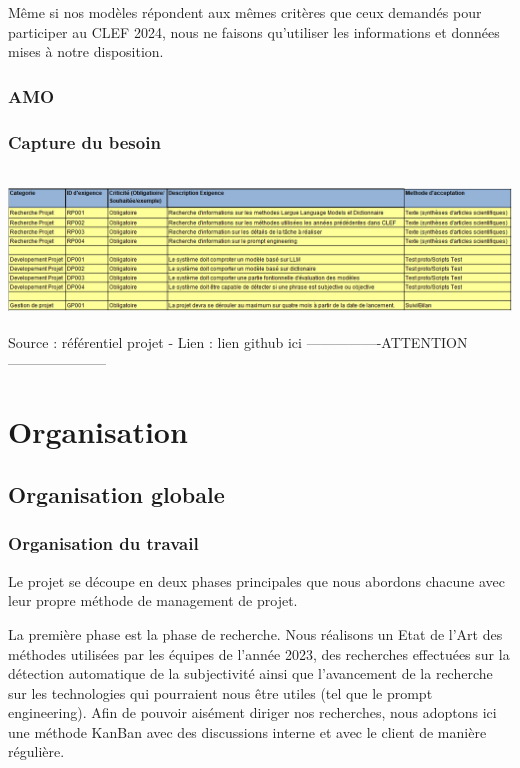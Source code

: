 \documentclass[11pt]{rapport_class}
\begin{document}
Même si nos modèles répondent aux mêmes critères que ceux demandés pour participer au CLEF 2024, nous ne faisons qu'utiliser les informations et données mises à notre disposition.


\subsection{AMO}

\subsection{Capture du besoin}
\begin{center}
\includegraphics[height=4.2cm]{capture_besoin.png}\\
\tiny
 Source : référentiel projet - Lien : lien github ici ----------------ATTENTION---------------------
\end{center}

\chapter{Organisation}
\section{Organisation globale}

\subsection{Organisation du travail}
\qquad Le projet se découpe en deux phases principales que nous abordons chacune avec leur propre méthode de management de projet.

La première phase est la phase de recherche. Nous réalisons un Etat de l'Art des méthodes utilisées par les équipes de l'année 2023, des recherches effectuées sur la détection automatique de la subjectivité ainsi que l'avancement de la recherche sur les technologies qui pourraient nous être utiles (tel que le prompt engineering). Afin de pouvoir aisément diriger nos recherches, nous adoptons ici une méthode KanBan avec des discussions interne et avec le client de manière régulière.
\end{document}

